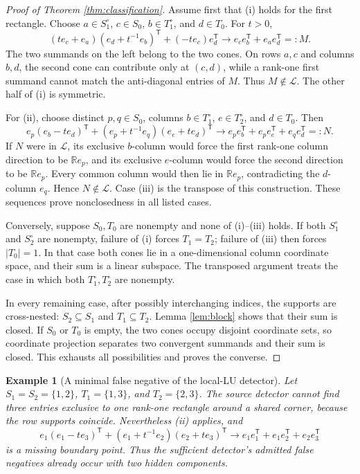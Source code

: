 \documentclass[11pt]{article}
\newtheorem{example}{Example}
\newcommand{\R}{\mathbb{R}}
\begin{document}
\begin{proof}[Proof of Theorem \ref{thm:classification}]
Assume first that (i) holds for the first rectangle. Choose
$a\in S_1^\circ$, $c\in S_0$, $b\in T_1^\circ$, and $d\in T_0$. For $t>0$,
\[
 (t e_c+e_a)(e_d+t^{-1}e_b)^{\mathsf T}
       +(-t e_c)e_d^{\mathsf T}
 \longrightarrow e_c e_b^{\mathsf T}+e_a e_d^{\mathsf T}=:M.
 \tag{3}
\]
The two summands on the left belong to the two cones. On rows $a,c$ and columns
$b,d$, the second cone can contribute only at $(c,d)$, while a rank-one first
summand cannot match the anti-diagonal entries of $M$. Thus $M\notin\mathcal L$.
The other half of (i) is symmetric.

For (ii), choose distinct $p,q\in S_0$, columns
$b\in T_1^\circ$, $e\in T_2^\circ$, and $d\in T_0$. Then
\[
 e_p(e_b-t e_d)^{\mathsf T}
 +(e_p+t^{-1}e_q)(e_e+t e_d)^{\mathsf T}
 \longrightarrow
 e_p e_b^{\mathsf T}+e_p e_e^{\mathsf T}+e_q e_d^{\mathsf T}=:N.
 \tag{4}
\]
If $N$ were in $\mathcal L$, its exclusive $b$-column would force the first
rank-one column direction to be $\R e_p$, and its exclusive $e$-column would
force the second direction to be $\R e_p$. Every common column would then lie
in $\R e_p$, contradicting the $d$-column $e_q$. Hence $N\notin\mathcal L$.
Case (iii) is the transpose of this construction. These sequences prove
nonclosedness in all listed cases.

Conversely, suppose $S_0,T_0$ are nonempty and none of (i)--(iii) holds. If
both $S_1^\circ$ and $S_2^\circ$ are nonempty, failure of (i) forces
$T_1=T_2$; failure of (iii) then forces $|T_0|=1$. In that case both cones lie
in a one-dimensional column coordinate space, and their sum is a linear
subspace. The transposed argument treats the case in which both
$T_1^\circ,T_2^\circ$ are nonempty.

In every remaining case, after possibly interchanging indices, the supports
are cross-nested: $S_2\subseteq S_1$ and $T_1\subseteq T_2$. Lemma
\ref{lem:block} shows that their sum is closed. If $S_0$ or $T_0$ is empty,
the two cones occupy disjoint coordinate sets, so coordinate projection
separates two convergent summands and their sum is closed. This exhausts all
possibilities and proves the converse.
\end{proof}

\begin{example}[A minimal false negative of the local-LU detector]
Let $S_1=S_2=\{1,2\}$, $T_1=\{1,3\}$, and $T_2=\{2,3\}$. The source detector
cannot find three entries exclusive to one rank-one rectangle around a shared
corner, because the row supports coincide. Nevertheless (ii) applies, and
\[
 e_1(e_1-t e_3)^{\mathsf T}
 +(e_1+t^{-1}e_2)(e_2+t e_3)^{\mathsf T}
 \longrightarrow e_1e_1^{\mathsf T}+e_1e_2^{\mathsf T}+e_2e_3^{\mathsf T}
\]
is a missing boundary point. Thus the sufficient detector's admitted false
negatives already occur with two hidden components.
\end{example}
\end{document}

